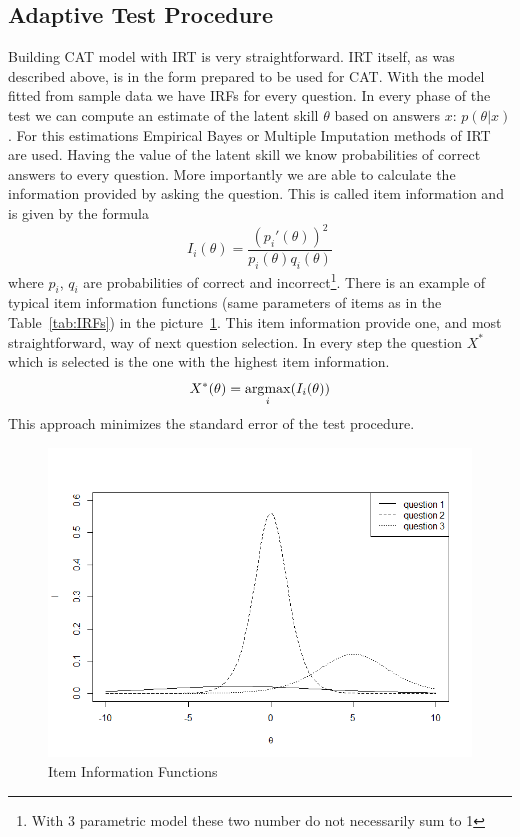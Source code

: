 \subsection{Adaptive Test Procedure}
Building CAT model with IRT is very straightforward. IRT itself, as was described above, is in the form prepared to be used for CAT. With the model fitted from sample data we have IRFs for every question. In every phase of the test we can compute an estimate of the latent skill $\theta$ based on answers $x$: $p(\theta|x)$. For this estimations Empirical Bayes or Multiple Imputation methods of IRT are used. Having the value of the latent skill we know probabilities of correct answers to every question. More importantly we are able to calculate the information provided by asking the question. This is called item information and is given by the formula
$$I_i(\theta)=\frac{(p_i'(\theta))^2}{p_i(\theta)q_i(\theta)}$$
where $p_i$, $q_i$ are probabilities of correct and incorrect\footnote{With 3 parametric model these two number do not necessarily sum to 1}. There is an example of typical item information functions (same parameters of items as in the Table~\ref{tab:IRFs}) in the picture~\ref{pic:IG}. This item information provide one, and most straightforward, way of next question selection. In every step the question $X^*$ which is selected is the one with the highest item information. 
$$X^*(\theta) = \operatorname*{\arg\!\max}_i(I_i(\theta))$$
This approach minimizes the standard error of the test procedure.

\begin{figure}%
\includegraphics[width=\columnwidth]{obr/IIs.png}%
\caption{Item Information Functions}%
\label{pic:IG}%
\end{figure}


